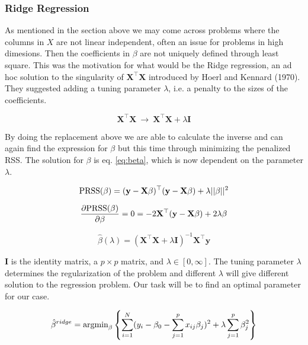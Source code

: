 \documentclass[a4paper,12pt, english]{article}
\begin{document}
\subsubsection{Ridge Regression}

As mentioned in the section above we may come across problems where the columns in $X$ are not linear independent, often an issue for problems in high dimesions. Then the coefficients in $\beta$ are not uniquely defined through least square. This was the motivation for what would be the Ridge regression, an ad hoc solution to the singularity of $\mathbf{X^{\top}}\mathbf{X}$ introduced by Hoerl and Kennard (1970).
They suggested adding a tuning parameter $\lambda$, i.e. a penalty to the sizes of the coefficients.

\begin{equation}
\mathbf{X}^{\top}\mathbf{X} \ \rightarrow \ \mathbf{X}^{\top}\mathbf{X} + \lambda\mathbf{I}
\end{equation}

By doing the replacement above we are able to calculate the inverse and can again find the expression for $\beta$ but this time through minimizing the penalized RSS. The solution for $\beta$ is eq. \ref{eq:beta}, which is now dependent on the parameter $\lambda$.

\begin{equation}
\textnormal{PRSS}(\beta) = (\mathbf{y} - \mathbf{X}\beta)^{\top}(\mathbf{y} - \mathbf{X}\beta) + \lambda ||\beta||^2
\end{equation}

\begin{equation}
\frac{\partial \textnormal{PRSS}(\beta)}{\partial \beta} = 0 = -2 \mathbf{X}^{\top}(\mathbf{y} - \mathbf{X}\beta) + 2 \lambda \beta
\end{equation}

\begin{equation} 
\hat{\beta}(\lambda) = (\mathbf{X}^{\top}\mathbf{X} + \lambda\mathbf{I})^{-1}\mathbf{X}^{\top}\mathbf{y}
\end{equation}

$\mathbf{I}$ is the identity matrix, a $p \times p$ matrix, and $\lambda \in [0, \infty]$. The tuning parameter $\lambda$ determines the regularization of the problem and different $\lambda$ will give different solution to the regression problem. Our task will be to find an optimal parameter for our case.

\begin{equation} \label{eq:b_ridge}
\hat{\beta}^{ridge} = \textnormal{argmin}_{\beta} \left \{ \sum_{i=1}^{N} (y_i - \beta_0 - \sum_{j=1}^{p} x_{ij} \beta_j)^2 + \lambda \sum_{j=1}^{p} \beta_j^2 \right \}
\end{equation}
\end{document}
